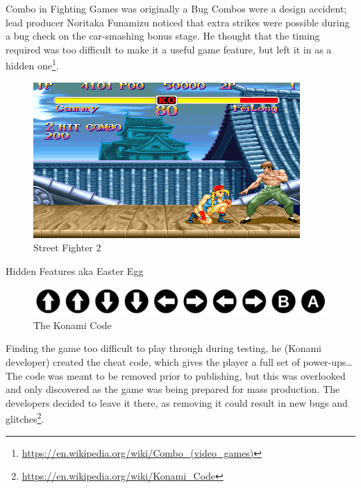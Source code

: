 \documentclass{beamer}
\begin{document}
\begin{frame}[t]{Combo in Fighting Games was originally a Bug}
    Combos were a design accident; lead producer Noritaka Funamizu noticed that extra strikes were possible during a bug check on the car-smashing bonus stage. He thought that the timing required was too difficult to make it a useful game feature, but left it in as a hidden one\footnote{\url{https://en.wikipedia.org/wiki/Combo_(video_games)}}.

    \begin{figure}
    \begin{center}
    \includegraphics[width=.5\textwidth]{Super_Street_Fighter_II_screenshot.png}
    \end{center}
    \caption{Street Fighter 2}
    \label{fig:}
    \end{figure}

\end{frame}

\begin{frame}{Hidden Features aka Easter Egg}
    \begin{figure}
    \begin{center}
        \includegraphics[width=.5\textwidth]{images/1280px-Konami_Code.svg.png}
    \end{center}
    \caption{The Konami Code}
    \label{fig:konami}
    \end{figure}

    Finding the game too difficult to play through during testing, he (Konami developer) created the cheat code, which gives the player a full set of power-ups\ldots The code was meant to be removed prior to publishing, but this was overlooked and only discovered as the game was being prepared for mass production. The developers decided to leave it there, as removing it could result in new bugs and glitches\footnote{\url{https://en.wikipedia.org/wiki/Konami_Code}}. 
\end{frame}
\end{document}
